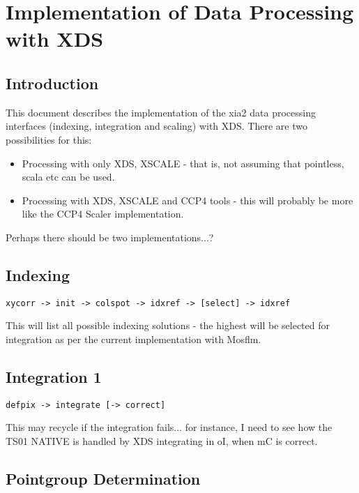 \documentclass[a4paper, 11pt]{article}
\begin{document}
\section{Implementation of Data Processing with 
XDS}

\subsection{Introduction}

This document describes the implementation of the xia2 data processing 
interfaces (indexing, integration and scaling) with XDS. There are
two possibilities for this:

\begin{itemize}
\item{Processing with only XDS, XSCALE - that is, not assuming that pointless,
scala etc can be used.}
\item{Processing with XDS, XSCALE and CCP4 tools - this will probably be more
like the CCP4 Scaler implementation.}
\end{itemize}

Perhaps there should be two implementations...?

\subsection{Indexing}

\begin{verbatim}
xycorr -> init -> colspot -> idxref -> [select] -> idxref
\end{verbatim}

This will list all possible indexing solutions - the highest will be selected
for integration as per the current implementation with Mosflm.

\subsection{Integration 1}

\begin{verbatim}
defpix -> integrate [-> correct]
\end{verbatim}

This may recycle if the integration fails... for instance, I need to see how
the TS01 NATIVE is handled by XDS integrating in oI, when mC is correct.

\subsection{Pointgroup Determination}
\end{document}
